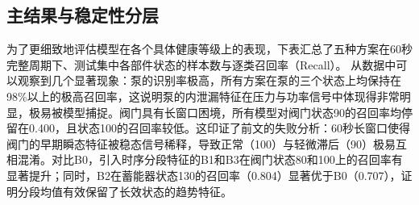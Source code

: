 \documentclass[12pt, a4paper]{ctexart}
\begin{document}
\subsection{主结果与稳定性分层}
为了更细致地评估模型在各个具体健康等级上的表现，下表汇总了五种方案在60秒完整周期下、测试集中各部件状态的样本数与逐类召回率（Recall）。
从数据中可以观察到几个显著现象：泵的识别率极高，所有方案在泵的三个状态上均保持在98\%以上的极高召回率，这说明泵的内泄漏特征在压力与功率信号中体现得非常明显，极易被模型捕捉。阀门具有长窗口困境，所有模型对阀门状态90的召回率均停留在0.400，且状态100的召回率较低。这印证了前文的失败分析：60秒长窗口使得阀门的早期瞬态特征被稳态信号稀释，导致正常（100）与轻微滞后（90）极易互相混淆。对比B0，引入时序分段特征的B1和B3在阀门状态80和100上的召回率有显著提升；同时，B2在蓄能器状态130的召回率（0.804）显著优于B0（0.707），证明分段均值有效保留了长效状态的趋势特征。
\end{document}
